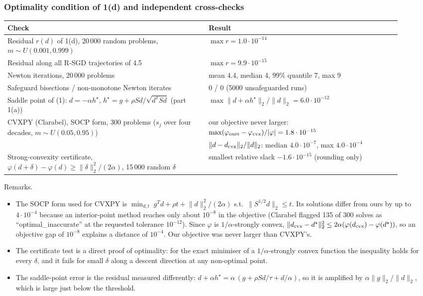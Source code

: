 \documentclass[11pt,a4paper]{article}
\newcommand{\norm}[1]{\lVert #1\rVert_2}
\begin{document}
\subsubsection*{Optimality condition of 1(d) and independent cross-checks}

\begin{center}
\begin{tabular}{@{}p{0.47\linewidth}p{0.45\linewidth}@{}}
\toprule
Check & Result \\
\midrule
Residual $r(d)$ of 1(d), 20\,000 random problems, $m\sim U(0.001,0.999)$ &
$\max r=1.0\cdot10^{-14}$ \\
Residual along all R-SGD trajectories of 4.5 & $\max r=9.9\cdot10^{-15}$ \\
Newton iterations, 20\,000 problems &
mean 4.4, median 4, 99\% quantile 7, max 9 \\
Safeguard bisections / non-monotone Newton iterates & $0$ / $0$ (5000 unsafeguarded runs) \\
Saddle point of (1): $d=-\alpha h^\star$,
$h^\star=g+\rho Sd/\sqrt{d^TSd}$ (part 1(a)) &
$\max\norm{d+\alpha h^\star}/\norm d=6.0\cdot10^{-12}$ \\
CVXPY (Clarabel), SOCP form, 300 problems ($s_j$ over four decades, $m\sim U(0.05,0.95)$) &
our objective never larger: $\max(\varphi_{\rm ours}-\varphi_{\rm cvx})/|\varphi|=1.8\cdot10^{-15}$ \\
& $\norm{d-d_{\rm cvx}}/\norm d$: median $4.0\cdot10^{-7}$, max $4.0\cdot10^{-4}$ \\
Strong-convexity certificate,
$\varphi(d+\delta)-\varphi(d)\ge\norm\delta^2/(2\alpha)$,
15\,000 random $\delta$ &
smallest relative slack $-1.6\cdot10^{-15}$ (rounding only) \\
\bottomrule
\end{tabular}
\end{center}

Remarks.
\begin{itemize}
\item The SOCP form used for CVXPY is
$\min_{d,t}\;g^Td+\rho t+\norm d^2/(2\alpha)$ s.t.\ $\norm{S^{1/2}d}\le t$. Its
solutions differ from ours by up to $4\cdot10^{-4}$ because an interior-point method
reaches only about $10^{-8}$ in the objective (Clarabel flagged 135 of 300 solves as
``optimal\_inaccurate'' at the requested tolerance $10^{-12}$). Since $\varphi$ is
$1/\alpha$-strongly convex, $\norm{d_{\rm cvx}-d^\star}^2\le2\alpha(\varphi(d_{\rm cvx})-\varphi(d^\star))$,
so an objective gap of $10^{-8}$ explains a distance of $10^{-4}$. Our objective was
never larger than CVXPY's.
\item The certificate test is a direct proof of optimality: for the exact minimiser of
a $1/\alpha$-strongly convex function the inequality holds for every $\delta$, and it
fails for small $\delta$ along a descent direction at any non-optimal point.
\item The saddle-point error is the residual measured differently:
$d+\alpha h^\star=\alpha\,(g+\rho Sd/\tau+d/\alpha)$, so it is amplified by
$\alpha\norm g/\norm d$, which is large just below the threshold.
\end{itemize}
\end{document}

